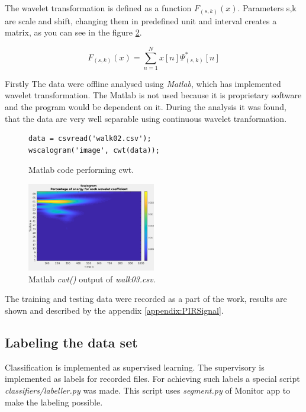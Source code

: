 The wavelet transformation is defined as a function $F_{(s,k)}(x)$. Parameters s,k are scale and shift, changing
them in predefined unit and interval creates a matrix, as you can see in the figure \ref{fig:walk03}.

\begin{equation}
F_{(s,k)}(x) = \sum_{n=1}^{N} x[n] \Psi_{(s,k)}^{*}[n]
\end{equation}

Firstly The data were offline analysed using {\it Matlab}, which has implemented wavelet transformation.
The Matlab is not used because it is proprietary software and the program would be dependent on it.
During the analysis it was found, that the data are very well separable using continuous wavelet tranformation.

\begin{figure}[h!]
\begin{lstlisting}[style=matlab]
data = csvread('walk02.csv');
wscalogram('image', cwt(data));
\end{lstlisting}
\caption{Matlab code performing cwt.\label{list:cwtmatlab}}
\end{figure}

\begin{figure}[h!]
\begin{center}
\includegraphics[width=0.5\textwidth]{img/walk03.png}
\caption{Matlab {\it cwt()} output of {\it walk03.csv}.\label{fig:walk03}}
\end{center}
\end{figure}


The training and testing data were recorded as a part of the work, results are
shown and described by the appendix \ref{appendix:PIRSignal}.

\subsection*{Labeling the data set}
Classification is implemented as supervised learning. The supervisory is implemented
as labels for recorded files. For achieving such labels a special script {\it classifiers/labeller.py}
was made. This script uses {\it segment.py} of Monitor app to make the labeling possible.

